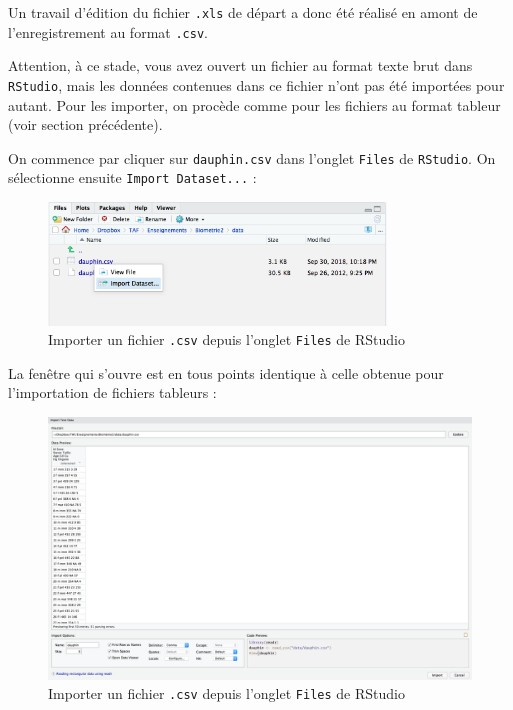 \documentclass[
  a4paper,
  DIV=11,
  numbers=noendperiod,
  oneside]{scrreprt}
\begin{document}
Un travail d'édition du fichier \texttt{.xls} de départ a donc été
réalisé en amont de l'enregistrement au format \texttt{.csv}.

Attention, à ce stade, vous avez ouvert un fichier au format texte brut
dans \texttt{RStudio}, mais les données contenues dans ce fichier n'ont
pas été importées pour autant. Pour les importer, on procède comme pour
les fichiers au format tableur (voir section précédente).

On commence par cliquer sur \texttt{dauphin.csv} dans l'onglet
\texttt{Files} de \texttt{RStudio}. On sélectionne ensuite
\texttt{Import\ Dataset...} :

\begin{figure}[H]

{\centering \includegraphics[width=0.8\textwidth,height=\textheight]{images/importcsv1.png}

}

\caption{Importer un fichier \texttt{.csv} depuis l'onglet
\texttt{Files} de RStudio}

\end{figure}%

La fenêtre qui s'ouvre est en tous points identique à celle obtenue pour
l'importation de fichiers tableurs :

\begin{figure}[H]

{\centering \includegraphics[width=1\textwidth,height=\textheight]{images/importcsv2.png}

}

\caption{Importer un fichier \texttt{.csv} depuis l'onglet
\texttt{Files} de RStudio}

\end{figure}%
\end{document}
